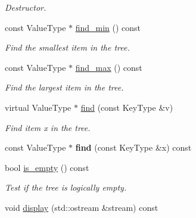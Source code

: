 \begin{CompactItemize}
\begin{CompactList}\small\item\em Destructor. \item\end{CompactList}\item 
const ValueType $\ast$ \hyperlink{classSkipList_3_01ValueType_00_01KeyType_00_01MAX__GAP_00_01MemStorage_00_01LockType_01_4_3a779082b51cc31b13d0cd88931f6952}{find\_\-min} () const 
\begin{CompactList}\small\item\em Find the smallest item in the tree. \item\end{CompactList}\item 
const ValueType $\ast$ \hyperlink{classSkipList_3_01ValueType_00_01KeyType_00_01MAX__GAP_00_01MemStorage_00_01LockType_01_4_b9bd70f284edf7639c7f2320fe39176a}{find\_\-max} () const 
\begin{CompactList}\small\item\em Find the largest item in the tree. \item\end{CompactList}\item 
virtual ValueType $\ast$ \hyperlink{classSkipList_3_01ValueType_00_01KeyType_00_01MAX__GAP_00_01MemStorage_00_01LockType_01_4_fb164870329e594f7e8ab87df47ff502}{find} (const KeyType \&v)
\begin{CompactList}\small\item\em Find item x in the tree. \item\end{CompactList}\item 
\hypertarget{classSkipList_3_01ValueType_00_01KeyType_00_01MAX__GAP_00_01MemStorage_00_01LockType_01_4_72102b0600d0ba4c9405aae736aa48bd}{
const ValueType $\ast$ \textbf{find} (const KeyType \&x) const }
\label{classSkipList_3_01ValueType_00_01KeyType_00_01MAX__GAP_00_01MemStorage_00_01LockType_01_4_72102b0600d0ba4c9405aae736aa48bd}

\item 
bool \hyperlink{classSkipList_3_01ValueType_00_01KeyType_00_01MAX__GAP_00_01MemStorage_00_01LockType_01_4_fa6a9e000dee4c64e85d3e4ada7efae1}{is\_\-empty} () const 
\begin{CompactList}\small\item\em Test if the tree is logically empty. \item\end{CompactList}\item 
\hypertarget{classSkipList_3_01ValueType_00_01KeyType_00_01MAX__GAP_00_01MemStorage_00_01LockType_01_4_7e5769303e900cd31a0c41321fd85322}{
void \hyperlink{classSkipList_3_01ValueType_00_01KeyType_00_01MAX__GAP_00_01MemStorage_00_01LockType_01_4_7e5769303e900cd31a0c41321fd85322}{display} (std::ostream \&stream) const }
\label{classSkipList_3_01ValueType_00_01KeyType_00_01MAX__GAP_00_01MemStorage_00_01LockType_01_4_7e5769303e900cd31a0c41321fd85322}


\end{CompactItemize}
